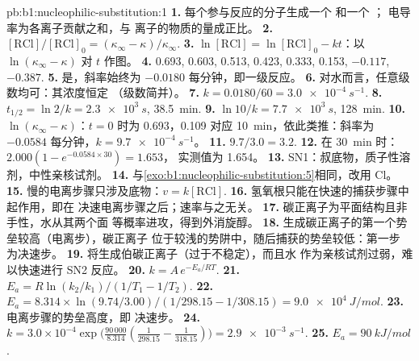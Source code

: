 \begin{solution}{pb:b1:nucleophilic-substitution:1}
\textbf{1.} 每个参与反应的分子生成一个  和一个 ；
电导率为各离子贡献之和，与
离子的物质的量成正比。
\textbf{2.} $[\mathrm{RCl}]/[\mathrm{RCl}]_0 = (\kappa_\infty -
\kappa)/\kappa_\infty$.
\textbf{3.} $\ln[\mathrm{RCl}] = \ln[\mathrm{RCl}]_0 - kt$：以
$\ln(\kappa_\infty - \kappa)$ 对 $t$ 作图。
\textbf{4.} 0.693, 0.603, 0.513, 0.423, 0.333, 0.153, $-0.117$, $-0.387$.
\textbf{5.} 是，斜率始终为 $-0.0180$ 每分钟，即一级反应。
\textbf{6.} 对水而言，任意级数均可：其浓度恒定
（级数简并）。
\textbf{7.} $k = 0.0180/60 = \qty{3.0e-4}{s^{-1}}$.
\textbf{8.} $t_{1/2} = \ln 2/k = \qty{2.3e3}{s}$, \qty{38.5}{min}.
\textbf{9.} $\ln 10/k = \qty{7.7e3}{s}$, \qty{128}{min}.
\textbf{10.} $\ln(\kappa_\infty - \kappa)$：$t = 0$ 时为 0.693，0.109 对应
\qty{10}{min}，依此类推：斜率为 $-0.0584$ 每分钟，$k = \qty{9.7e-4}{s^{-1}}$。
\textbf{11.} $9.7/3.0 = 3.2$.
\textbf{12.} 在 \qty{30}{min} 时：$2.000(1 - e^{-0.0584 \times 30}) = 1.653$，
实测值为 1.654。
\textbf{13.} SN1：叔底物，质子性溶剂，中性亲核试剂。
\textbf{14.} 与\cref{exo:b1:nucleophilic-substitution:5}相同，改用 Cl。
\textbf{15.} 慢的电离步骤只涉及底物：$v =
k[\mathrm{RCl}]$.
\textbf{16.} 氢氧根只能在快速的捕获步骤中起作用，即在
决速电离步骤之后；速率与之无关。
\textbf{17.} 碳正离子为平面结构且非手性，水从其两个面
等概率进攻，得到外消旋醇。
\textbf{18.} 生成碳正离子的第一个势垒较高（电离步），碳正离子
位于较浅的势阱中，随后捕获的势垒较低：第一步
为决速步。
\textbf{19.} 将生成伯碳正离子（过于不稳定），而且水
作为亲核试剂过弱，难以快速进行 SN2 反应。
\textbf{20.} $k = A\,e^{-E_a/RT}$.
\textbf{21.} $E_a = R\ln(k_2/k_1)/(1/T_1 - 1/T_2)$.
\textbf{22.} $E_a = 8.314 \times \ln(9.74/3.00)/(1/298.15 - 1/308.15) =
\qty{9.0e4}{J/mol}$.
\textbf{23.} 电离步骤的势垒高度，即
决速步。
\textbf{24.} $k = 3.0 \times 10^{-4} \exp\bigl(\frac{90\,000}{8.314}
(\frac{1}{298.15} - \frac{1}{318.15})\bigr) = \qty{2.9e-3}{s^{-1}}$.
\textbf{25.} \textbf{$E_a = \qty{90}{kJ/mol}$}.
\end{solution}

